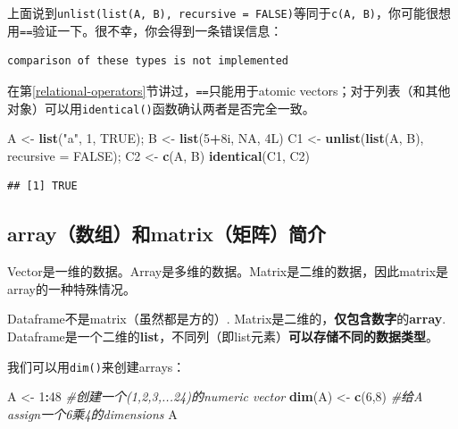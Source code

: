 \documentclass[]{book}
\newenvironment{Shaded}{\begin{snugshade}}{\end{snugshade}}
\newcommand{\CommentTok}[1]{\textcolor[rgb]{0.56,0.35,0.01}{\textit{#1}}}
\newcommand{\DataTypeTok}[1]{\textcolor[rgb]{0.13,0.29,0.53}{#1}}
\newcommand{\DecValTok}[1]{\textcolor[rgb]{0.00,0.00,0.81}{#1}}
\newcommand{\KeywordTok}[1]{\textcolor[rgb]{0.13,0.29,0.53}{\textbf{#1}}}
\newcommand{\NormalTok}[1]{#1}
\newcommand{\OperatorTok}[1]{\textcolor[rgb]{0.81,0.36,0.00}{\textbf{#1}}}
\newcommand{\OtherTok}[1]{\textcolor[rgb]{0.56,0.35,0.01}{#1}}
\newcommand{\StringTok}[1]{\textcolor[rgb]{0.31,0.60,0.02}{#1}}
\begin{document}
上面说到\texttt{unlist(list(A,\ B),\ recursive\ =\ FALSE)}等同于\texttt{c(A,\ B)}，你可能很想用\texttt{==}验证一下。很不幸，你会得到一条错误信息：

\begin{verbatim}
comparison of these types is not implemented
\end{verbatim}

在第\ref{relational-operators}节讲过，\texttt{==}只能用于atomic vectors；对于列表（和其他对象）可以用\texttt{identical()}函数确认两者是否完全一致。

\begin{Shaded}
\begin{Highlighting}[]
\NormalTok{A <-}\StringTok{ }\KeywordTok{list}\NormalTok{(}\StringTok{"a"}\NormalTok{, }\DecValTok{1}\NormalTok{, }\OtherTok{TRUE}\NormalTok{); B <-}\StringTok{ }\KeywordTok{list}\NormalTok{(}\DecValTok{5}\OperatorTok{+}\NormalTok{8i, }\OtherTok{NA}\NormalTok{, 4L)}
\NormalTok{C1 <-}\StringTok{ }\KeywordTok{unlist}\NormalTok{(}\KeywordTok{list}\NormalTok{(A, B), }\DataTypeTok{recursive =} \OtherTok{FALSE}\NormalTok{); C2 <-}\StringTok{ }\KeywordTok{c}\NormalTok{(A, B)}
\KeywordTok{identical}\NormalTok{(C1, C2)}
\end{Highlighting}
\end{Shaded}

\begin{verbatim}
## [1] TRUE
\end{verbatim}

\hypertarget{matrix-array}{%
\subsection{array（数组）和matrix（矩阵）简介}\label{matrix-array}}

Vector是一维的数据。Array是多维的数据。Matrix是二维的数据，因此matrix是array的一种特殊情况。

Dataframe不是matrix（虽然都是方的）. Matrix是二维的，\textbf{仅包含数字}的\textbf{array}. Dataframe是一个二维的\textbf{list}，不同列（即list元素）\textbf{可以存储不同的数据类型}。

我们可以用\texttt{dim()}来创建arrays：

\begin{Shaded}
\begin{Highlighting}[]
\NormalTok{A <-}\StringTok{ }\DecValTok{1}\OperatorTok{:}\DecValTok{48} \CommentTok{#创建一个(1,2,3,...24)的numeric vector}
\KeywordTok{dim}\NormalTok{(A) <-}\StringTok{ }\KeywordTok{c}\NormalTok{(}\DecValTok{6}\NormalTok{,}\DecValTok{8}\NormalTok{) }\CommentTok{#给A assign一个6乘4的dimensions}
\NormalTok{A}
\end{Highlighting}
\end{Shaded}
\end{document}
